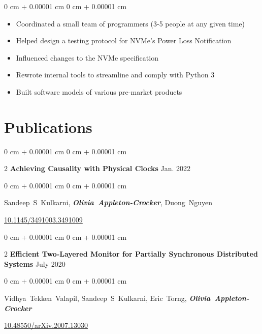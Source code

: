 \documentclass[10pt, letterpaper]{article}
\newenvironment{highlights}{ \begin{itemize}[ topsep=0.10 cm, parsep=0.10 cm, partopsep=0pt,
itemsep=0pt, leftmargin=0 cm + 10pt ] }{ \end{itemize} } %
\newenvironment{onecolentry}{ \begin{adjustwidth}{ 0 cm + 0.00001 cm }{ 0 cm + 0.00001 cm }
}{ \end{adjustwidth} } %
\newenvironment{twocolentry}[2][]{ \onecolentry \def\secondColumn{#2} \setcolumnwidth{\fill, 4.5 cm}
\begin{paracol}{2} }{ \switchcolumn \raggedleft \secondColumn \end{paracol}
\endonecolentry } %
\begin{document}
	\vspace{-0.35 cm}
	\begin{onecolentry}
		\begin{highlights}
			\item Coordinated a small team of programmers (3-5 people at any given
			time) \item Helped design a testing protocol for NVMe's Power Loss Notification
			\item Influenced changes to the NVMe specification \item Rewrote internal tools
			to streamline and comply with Python 3 \item Built software models of various
			pre-market products
		\end{highlights}
	\end{onecolentry}

	\section{Publications}

	\begin{samepage}
		\begin{twocolentry}
			{ Jan. 2022 } \textbf{Achieving Causality with Physical Clocks}
		\end{twocolentry}

		\vspace{0.10 cm}

		\begin{onecolentry}
			\mbox{Sandeep S Kulkarni},
			\mbox{\textbf{\textit{Olivia Appleton-Crocker}}}, \mbox{Duong Nguyen}

			\vspace{0.10 cm}

			\href{https://doi.org/10.1145/3491003.3491009}{10.1145/3491003.3491009}
		\end{onecolentry}
	\end{samepage}

    \vspace{0.2 cm}

	\begin{samepage}
		\begin{twocolentry}
			{ July 2020 } \textbf{Efficient Two-Layered Monitor for Partially
			Synchronous Distributed Systems}
		\end{twocolentry}

		\vspace{0.10 cm}

		\begin{onecolentry}
			\mbox{Vidhya Tekken Valapil}, \mbox{Sandeep S Kulkarni}, \mbox{Eric Torng},
			\mbox{\textbf{\textit{Olivia Appleton-Crocker}}}

			\vspace{0.10 cm}

			\href{https://doi.org/10.48550/arXiv.2007.13030}{10.48550/arXiv.2007.13030}
		\end{onecolentry}
	\end{samepage}
\end{document}
